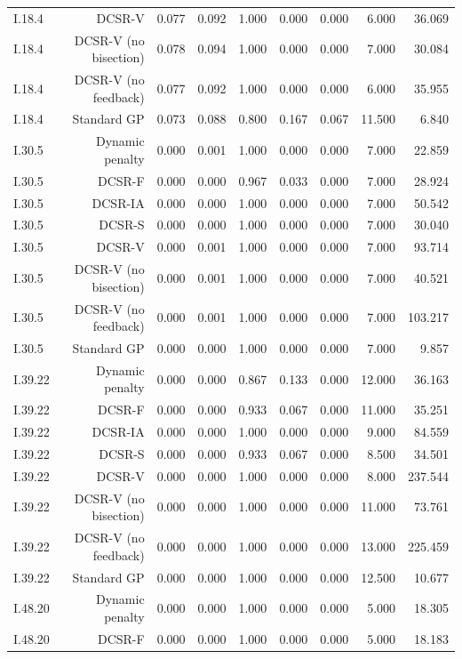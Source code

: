 \begin{tabular}{lrrrrrrrr}
I.18.4 & DCSR-V & 0.077 & 0.092 & 1.000 & 0.000 & 0.000 & 6.000 & 36.069 \\
I.18.4 & DCSR-V (no bisection) & 0.078 & 0.094 & 1.000 & 0.000 & 0.000 & 7.000 & 30.084 \\
I.18.4 & DCSR-V (no feedback) & 0.077 & 0.092 & 1.000 & 0.000 & 0.000 & 6.000 & 35.955 \\
I.18.4 & Standard GP & 0.073 & 0.088 & 0.800 & 0.167 & 0.067 & 11.500 & 6.840 \\
I.30.5 & Dynamic penalty & 0.000 & 0.001 & 1.000 & 0.000 & 0.000 & 7.000 & 22.859 \\
I.30.5 & DCSR-F & 0.000 & 0.000 & 0.967 & 0.033 & 0.000 & 7.000 & 28.924 \\
I.30.5 & DCSR-IA & 0.000 & 0.000 & 1.000 & 0.000 & 0.000 & 7.000 & 50.542 \\
I.30.5 & DCSR-S & 0.000 & 0.000 & 1.000 & 0.000 & 0.000 & 7.000 & 30.040 \\
I.30.5 & DCSR-V & 0.000 & 0.001 & 1.000 & 0.000 & 0.000 & 7.000 & 93.714 \\
I.30.5 & DCSR-V (no bisection) & 0.000 & 0.001 & 1.000 & 0.000 & 0.000 & 7.000 & 40.521 \\
I.30.5 & DCSR-V (no feedback) & 0.000 & 0.001 & 1.000 & 0.000 & 0.000 & 7.000 & 103.217 \\
I.30.5 & Standard GP & 0.000 & 0.000 & 1.000 & 0.000 & 0.000 & 7.000 & 9.857 \\
I.39.22 & Dynamic penalty & 0.000 & 0.000 & 0.867 & 0.133 & 0.000 & 12.000 & 36.163 \\
I.39.22 & DCSR-F & 0.000 & 0.000 & 0.933 & 0.067 & 0.000 & 11.000 & 35.251 \\
I.39.22 & DCSR-IA & 0.000 & 0.000 & 1.000 & 0.000 & 0.000 & 9.000 & 84.559 \\
I.39.22 & DCSR-S & 0.000 & 0.000 & 0.933 & 0.067 & 0.000 & 8.500 & 34.501 \\
I.39.22 & DCSR-V & 0.000 & 0.000 & 1.000 & 0.000 & 0.000 & 8.000 & 237.544 \\
I.39.22 & DCSR-V (no bisection) & 0.000 & 0.000 & 1.000 & 0.000 & 0.000 & 11.000 & 73.761 \\
I.39.22 & DCSR-V (no feedback) & 0.000 & 0.000 & 1.000 & 0.000 & 0.000 & 13.000 & 225.459 \\
I.39.22 & Standard GP & 0.000 & 0.000 & 1.000 & 0.000 & 0.000 & 12.500 & 10.677 \\
I.48.20 & Dynamic penalty & 0.000 & 0.000 & 1.000 & 0.000 & 0.000 & 5.000 & 18.305 \\
I.48.20 & DCSR-F & 0.000 & 0.000 & 1.000 & 0.000 & 0.000 & 5.000 & 18.183 \\

\end{tabular}
